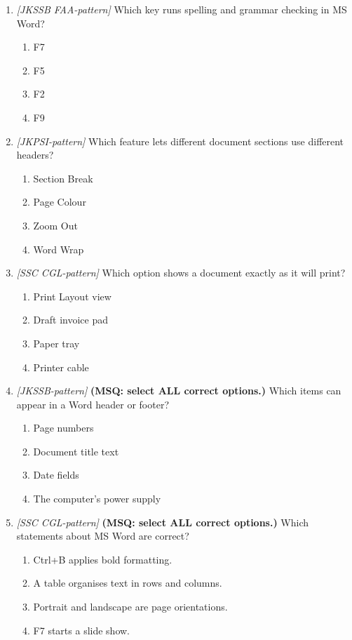 \documentclass[11pt]{article}
\begin{document}
\begin{enumerate}[label=\textbf{Q\arabic*.}, leftmargin=*]
\item \textit{[JKSSB FAA-pattern]} Which key runs spelling and grammar checking in MS Word?
  \begin{enumerate}[label=\Alph*.]
    \item F7
    \item F5
    \item F2
    \item F9
  \end{enumerate}
\item \textit{[JKPSI-pattern]} Which feature lets different document sections use different headers?
  \begin{enumerate}[label=\Alph*.]
    \item Section Break
    \item Page Colour
    \item Zoom Out
    \item Word Wrap
  \end{enumerate}
\item \textit{[SSC CGL-pattern]} Which option shows a document exactly as it will print?
  \begin{enumerate}[label=\Alph*.]
    \item Print Layout view
    \item Draft invoice pad
    \item Paper tray
    \item Printer cable
  \end{enumerate}
\item \textit{[JKSSB-pattern]} \textbf{(MSQ: select ALL correct options.)} Which items can appear in a Word header or footer?
  \begin{enumerate}[label=\Alph*.]
    \item Page numbers
    \item Document title text
    \item Date fields
    \item The computer's power supply
  \end{enumerate}
\item \textit{[SSC CGL-pattern]} \textbf{(MSQ: select ALL correct options.)} Which statements about MS Word are correct?
  \begin{enumerate}[label=\Alph*.]
    \item Ctrl+B applies bold formatting.
    \item A table organises text in rows and columns.
    \item Portrait and landscape are page orientations.
    \item F7 starts a slide show.
  \end{enumerate}
\end{enumerate}
\def\JKSSBLessonID{23}\def\JKSSBAnswers{0}
\end{document}
